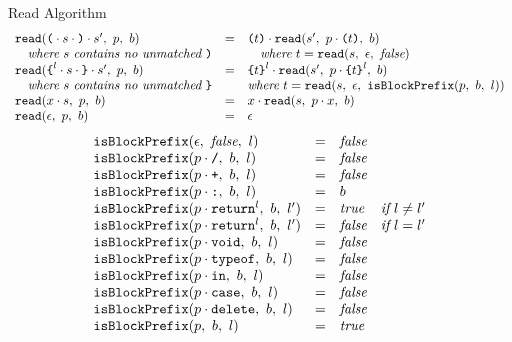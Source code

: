 \documentclass[preprint,10pt]{sigplanconf}
\begin{document}
\begin{displayfigure*}{\label{fig:read}Read Algorithm}
\[\begin{array}{lcll}
    \texttt{read}(\texttt{(} \cdot s \cdot \texttt{)} \cdot s',~p,~b)
    &=&
    \texttt{(}t\texttt{)} \cdot 
      \texttt{read}(s',~p \cdot \texttt{(}t\texttt{)},~b)
    
    \\
    \quad \textit{where}~s~\textit{contains no unmatched}~\texttt{)} 
    &&\quad \textit{where}~t = \texttt{read}(s,~\epsilon,~\textit{false}) 
    \\
    \texttt{read}(
      \texttt{\{}^l \cdot s \cdot \texttt{\}} \cdot s'
    ,~p,~b)
    &=&
    \texttt{\{}t\texttt{\}}^l \cdot 
      \texttt{read}(s',~
        p \cdot \texttt{\{}t\texttt{\}}^l
      ,~b)
    
    \\
    \quad \textit{where}~s~\textit{contains no unmatched}~\texttt{\}} 
    && \textit{where}~t = \texttt{read}(s,~\epsilon,~\texttt{isBlockPrefix}(p,~b,~l))
    \\
    \texttt{read}(x \cdot s,~p,~b)
    &=&
    x \cdot 
      \texttt{read}(s,~p \cdot x,~b)
   
    \\
    \texttt{read}(\epsilon,~p,~b)
    &=&
    \epsilon \\
  \end{array}
\]
\[
  \begin{array}{lcll}
    \texttt{isBlockPrefix}(\epsilon,~\textit{false},~l) &=& \textit{false}
    \\
    \texttt{isBlockPrefix}(p \cdot \texttt{/},~b,~l) &=& \textit{false}
    \\
    \texttt{isBlockPrefix}(p \cdot \texttt{+},~b,~l) &=& \textit{false}
    \\
    \texttt{isBlockPrefix}(p \cdot \texttt{:},~b,~l) &=& b
    \\
    \texttt{isBlockPrefix}(p \cdot \texttt{return}^{l},~b,~l') &=& \textit{true} 
    & \textit{if}~l \not = l'
    \\
    \texttt{isBlockPrefix}(p \cdot \texttt{return}^{l},~b,~l') &=& \textit{false} 
    & \textit{if}~l = l'
    \\
    \texttt{isBlockPrefix}(p \cdot \texttt{void},~b,~l) &=& \textit{false}
    \\
    \texttt{isBlockPrefix}(p \cdot \texttt{typeof},~b,~l) &=& \textit{false}
    \\
    \texttt{isBlockPrefix}(p \cdot \texttt{in},~b,~l) &=& \textit{false}
    \\
    \texttt{isBlockPrefix}(p \cdot \texttt{case},~b,~l) &=& \textit{false}
    \\
    \texttt{isBlockPrefix}(p \cdot \texttt{delete},~b,~l) &=& \textit{false}
    \\
    \texttt{isBlockPrefix}(p ,~b,~l) &=& \textit{true}
    \\
  \end{array}
\]
\end{displayfigure*}
\end{document}
